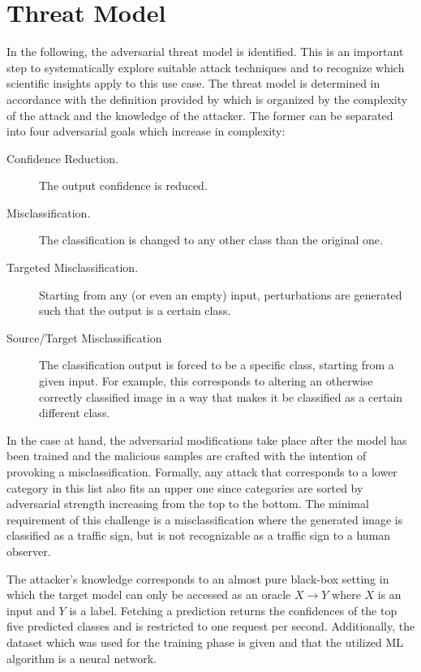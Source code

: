 
\section{Threat Model}
\label{sec:threatmodel}
In the following, the adversarial threat model is identified.
This is an important step to systematically explore suitable attack techniques and to recognize which scientific insights apply to this use case.
The threat model is determined in accordance with the definition provided by \citet{papernot2016limitations} which is organized by the complexity of the attack and the knowledge of the attacker.
The former can be separated into four adversarial goals which increase in complexity:
\begin{description}
	\item [Confidence Reduction.] The output confidence is reduced.
	\item [Misclassification.] The classification is changed to any other class than the original one.
	\item [Targeted Misclassification.] Starting from any (or even an empty) input, perturbations are generated such that the output is a certain class.
	\item [Source/Target Misclassification] The classification output is forced to be a specific class, starting from a given input. For example, this corresponds to altering an otherwise correctly classified image in a way that makes it be classified as a certain different class.
\end{description}
In the case at hand, the adversarial modifications take place after the model has been trained and the malicious samples are crafted with the intention of provoking a misclassification.
Formally, any attack that corresponds to a lower category in this list also fits an upper one since categories are sorted by adversarial strength increasing from the top to the bottom.
The minimal requirement of this challenge is a misclassification where the generated image is classified as a traffic sign, but is not recognizable as a traffic sign to a human observer.

The attacker's knowledge corresponds to an almost pure black-box setting in which the target model can only be accessed as an oracle $X \rightarrow Y$ where $X$ is an input and $Y$ is a label.
Fetching a prediction returns the confidences of the top five predicted classes and is restricted to one request per second.
Additionally, the dataset which was used for the training phase is given and that the utilized ML algorithm is a neural network.